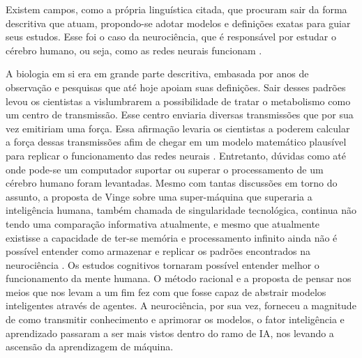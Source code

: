 Existem campos, como a própria linguística citada, que procuram sair da forma descritiva que atuam, propondo-se adotar modelos e definições exatas para guiar seus estudos. Esse foi o caso da neurociência, que é responsável por estudar o cérebro humano, ou seja, como as redes neurais funcionam \cite[10]{russell2003artificial}.

A biologia em si era em grande parte descritiva, embasada por anos de observação e pesquisas que até hoje apoiam suas definições. Sair desses padrões levou os cientistas a vislumbrarem a possibilidade de tratar o metabolismo como um centro de transmissão. Esse centro enviaria diversas transmissões que por sua vez emitiriam uma força. Essa afirmação levaria os cientistas a poderem calcular a força dessas transmissões afim de chegar em um modelo matemático plausível para replicar o funcionamento das redes neurais \cite[1-3]{rashevsky1960mathematical}. Entretanto, dúvidas como até onde pode-se um computador suportar ou superar o processamento de um cérebro humano foram levantadas. Mesmo com tantas discussões em torno do assunto, a proposta de Vinge sobre uma super-máquina que superaria a inteligência humana, também chamada de singularidade tecnológica, continua não tendo uma comparação informativa atualmente, e mesmo que atualmente existisse a capacidade de ter-se memória e processamento infinito ainda não é possível entender como armazenar e replicar os padrões encontrados na neurociência \cite[11-12]{vinge1993coming,russell2003artificial}. Os estudos cognitivos tornaram possível entender melhor o funcionamento da mente humana. O método racional e a proposta de pensar nos meios que nos levam a um fim fez com que fosse capaz de abstrair modelos inteligentes através de agentes. A neurociência, por sua vez, forneceu a magnitude de como transmitir conhecimento e aprimorar os modelos, o fator inteligência e aprendizado passaram a ser mais vistos dentro do ramo de IA, nos levando a ascensão da aprendizagem de máquina.

